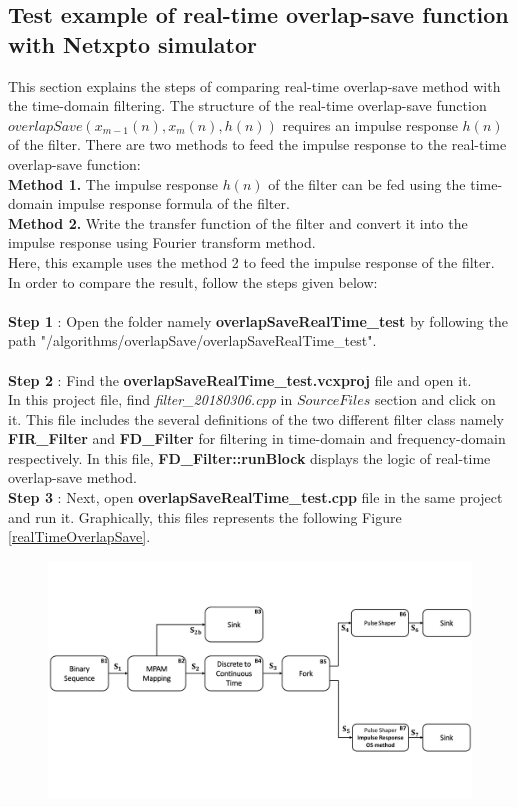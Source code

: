\begin{refsection}
\subsection*{Test example of real-time overlap-save function with Netxpto simulator}
This section explains the steps of comparing real-time overlap-save method with the time-domain filtering. The structure of the real-time overlap-save function $overlapSave(x_{m-1}(n), x_{m}(n), h(n))$ requires an impulse response $h(n)$ of the filter. There are two methods to feed the impulse response to the real-time overlap-save function:\\
\textbf{Method 1.} The impulse response $h(n)$ of the filter can be fed using the time-domain impulse response formula of the filter.\\
\textbf{Method 2.} Write the transfer function of the filter and convert it into the impulse response using Fourier transform method. \\
Here, this example uses the method 2 to feed the impulse response of the filter. In order to compare the result, follow the steps given below:\\ \\
\textbf{Step 1} : Open the folder namely \textbf{overlapSaveRealTime\_test} by following the path "/algorithms/overlapSave/overlapSaveRealTime\_test".\\ \\
\textbf{Step 2} : Find the \textbf{overlapSaveRealTime\_test.vcxproj} file and open it.\\
In this project file, find \textit{filter\_20180306.cpp} in $Source Files$ section and click on it. This file includes the several definitions of the two different filter class namely \textbf{FIR\_Filter} and \textbf{FD\_Filter} for filtering in time-domain and frequency-domain respectively. In this file, \textbf{FD\_Filter::runBlock} displays the logic of real-time overlap-save method.\\

\textbf{Step 3} : Next, open \textbf{overlapSaveRealTime\_test.cpp} file in the same project and run it. Graphically, this files represents the following Figure \ref*{realTimeOverlapSave}.\\
\begin{figure}[h]
	\centering
	\includegraphics[width=12cm]{./algorithms/overlap_save/figures/realTimeOverlapSaveIR.pdf}

\end{figure}
\end{refsection}
